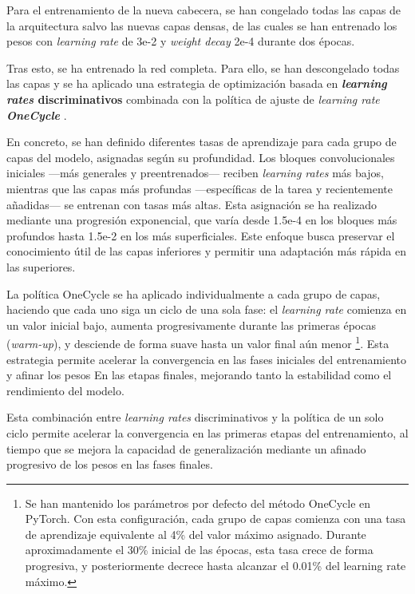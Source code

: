 Para el entrenamiento de la nueva cabecera, se han congelado todas las capas de la arquitectura salvo las nuevas capas densas, de las cuales se han entrenado los pesos con \textit{learning rate} de 3e-2 y \textit{weight decay} 2e-4 durante dos épocas.

Tras esto, se ha entrenado la red completa. Para ello, se han descongelado todas las capas y se ha aplicado una estrategia de optimización basada en \textbf{\textit{learning rates} discriminativos} combinada con la política de ajuste de \textit{learning rate \textbf{OneCycle}} \cite{smith2018}.

En concreto, se han definido diferentes tasas de aprendizaje para cada grupo de capas del modelo, asignadas según su profundidad. Los bloques convolucionales iniciales ---más generales y preentrenados--- reciben \textit{learning rates} más bajos, mientras que las capas más profundas ---específicas de la tarea y recientemente añadidas--- se entrenan con tasas más altas. Esta asignación se ha realizado mediante una progresión exponencial, que varía desde 1.5e-4 en los bloques más profundos hasta 1.5e-2 en los más superficiales. Este enfoque busca preservar el conocimiento útil de las capas inferiores y permitir una adaptación más rápida en las superiores.

La política OneCycle se ha aplicado individualmente a cada grupo de capas, haciendo que cada uno siga un ciclo de una sola fase: el \textit{learning rate} comienza en un valor inicial bajo, aumenta progresivamente durante las primeras épocas (\textit{warm-up}), y desciende de forma suave hasta un valor final aún menor%
\footnote{
    Se han mantenido los parámetros por defecto del método OneCycle en PyTorch. Con esta configuración, cada grupo de capas comienza con una tasa de aprendizaje equivalente al 4\% del valor máximo asignado. Durante aproximadamente el 30\% inicial de las épocas, esta tasa crece de forma progresiva, y posteriormente decrece hasta alcanzar el 0.01\% del learning rate máximo.
}. 
Esta estrategia permite acelerar la convergencia en las fases iniciales del entrenamiento y afinar los pesos En las etapas finales, mejorando tanto la estabilidad como el rendimiento del modelo.

Esta combinación entre \textit{learning rates} discriminativos y la política de un solo ciclo permite acelerar la convergencia en las primeras etapas del entrenamiento, al tiempo que se mejora la capacidad de generalización mediante un afinado progresivo de los pesos en las fases finales.

